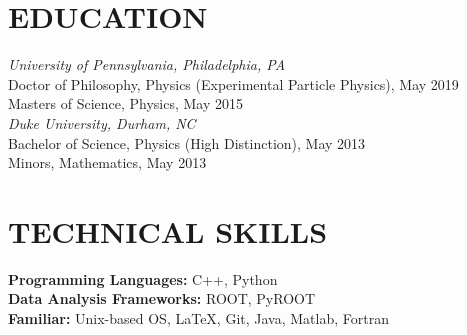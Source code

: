 \documentclass{res}
\begin{document}
\begin{resume}

 
\section{EDUCATION}          
    {\it University of Pennsylvania, Philadelphia, PA} \\
    Doctor of Philosophy, Physics (Experimental Particle Physics), May 2019 \\
    Masters of Science, Physics, May 2015 \\
    \newline
    {\it Duke University, Durham, NC} \\        
    Bachelor of Science, Physics (High Distinction), May 2013   \\       
    Minors, Mathematics, May 2013 
 
\section{TECHNICAL SKILLS}
    {\bf Programming Languages:} C++, Python\\
    {\bf Data Analysis Frameworks:} ROOT, PyROOT\\
    {\bf Familiar:} Unix-based OS, \LaTeX, Git, Java, Matlab, Fortran


\end{resume}
\end{document}
